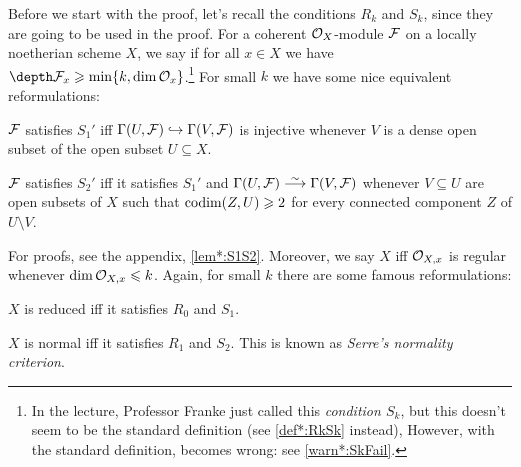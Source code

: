 \begin{rem}\label{rem:RkSk}
	Before we start with the proof, let's recall the conditions $R_k$ and $S_k$, since they are going to be used in the proof. For a coherent $\mathcal{O}_X$-module $\mathcal{F}$ on a locally noetherian scheme $X$, we say  if for all $x\in X$ we have $\depth\Ff_x\geq \min\{k,\dim\Oo_x\}$.\footnote{In the lecture, Professor Franke just called this \emph{condition $S_k$}, but this doesn't seem to be the standard definition (see \cref{def*:RkSk} instead), However, with the standard definition,  becomes wrong: see \cref{warn*:SkFail}.} For small $k$ we have some nice equivalent reformulations:
	\begin{numerate}
		\item $\mathcal{F}$ satisfies $S_1'$ iff $\Gamma(U,\Ff)\monomorphism\Global(V,\Ff)$ is injective whenever $V$ is a dense open subset of the open subset $U\subseteq X$.
		\item $\mathcal{F}$ satisfies $S_2'$ iff it satisfies $S_1'$ and $\Global(U,\Ff)\isomorphism\Global(V,\Ff)$ whenever $V\subseteq U$ are open subsets of $X$ such that $\operatorname{codim}(Z,U)\geqslant 2$ for every connected component $Z$ of $U\setminus V$.
	\end{numerate}
	For proofs, see the appendix, \cref{lem*:S1S2}. Moreover, we say $X$  iff $\mathcal{O}_{X,x}$ is regular whenever $\dim\mathcal{O}_{X,x}\leqslant k$. Again, for small $k$ there are some famous reformulations:
	\begin{alphanumerate}
		\item $X$ is reduced iff it satisfies $R_0$ and $S_1$.
		\item $X$ is normal iff it satisfies $R_1$ and $S_2$. This is known as \emph{Serre's normality criterion}.
	\end{alphanumerate}
\end{rem}
